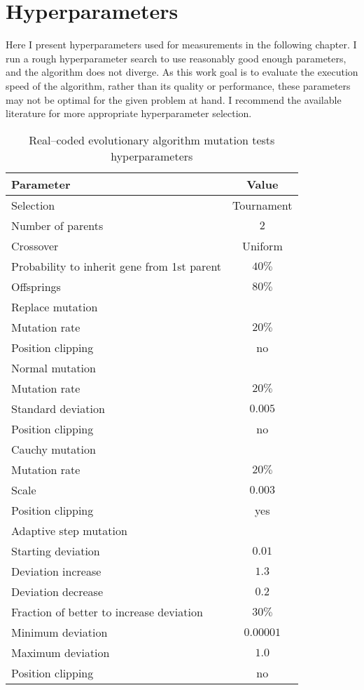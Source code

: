 \chapter{Hyperparameters}
\label{chap:hyperparameters}

Here I present hyperparameters used for measurements in the following chapter. I run a rough hyperparameter search to use reasonably good enough parameters, and the algorithm does not diverge. As this work goal is to evaluate the execution speed of the algorithm, rather than its quality or performance, these parameters may not be optimal for the given problem at hand. I recommend the available literature for more appropriate hyperparameter selection. 

\begin{table}[h]
    \centering
    \begin{tabular}{|l|c|}
        \hline
        \textbf{Parameter} & \textbf{Value} \\
        \hline
        Selection & Tournament \\
        \quad Number of parents & $2$ \\
        Crossover & Uniform \\
        \quad Probability to inherit gene from 1st parent & $40\%$ \\
        \quad Offsprings & $80\%$ \\
        \hline
        Replace mutation & \\
        \quad Mutation rate & $20\%$ \\
        \quad Position clipping & no \\
        Normal mutation & \\
        \quad Mutation rate & $20\%$ \\
        \quad Standard deviation & $0.005$ \\
        \quad Position clipping & no \\
        Cauchy mutation & \\
        \quad Mutation rate & $20\%$ \\
        \quad Scale & $0.003$ \\
        \quad Position clipping & yes \\
        Adaptive step mutation & \\
        \quad Starting deviation & $0.01$ \\
        \quad Deviation increase & $1.3$ \\
        \quad Deviation decrease & $0.2$ \\
        \quad Fraction of better to increase deviation & $30\%$ \\
        \quad Minimum deviation & $0.00001$ \\
        \quad Maximum deviation & $1.0$ \\
        \quad Position clipping & no \\
        \hline
    \end{tabular}
    \caption{Real--coded evolutionary algorithm mutation tests hyperparameters}
    \label{tab:esmutationhyperparmarameters}
\end{table}

